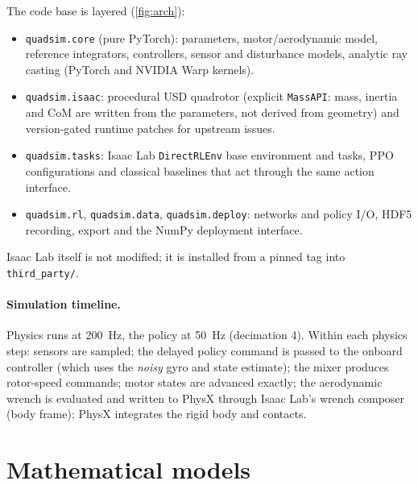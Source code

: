 \documentclass[11pt,a4paper]{article}
\begin{document}
The code base is layered (\cref{fig:arch}):
\begin{itemize}
\item \texttt{quadsim.core} (pure PyTorch): parameters, motor/aerodynamic model, reference integrators, controllers,
sensor and disturbance models, analytic ray casting (PyTorch and NVIDIA Warp kernels).
\item \texttt{quadsim.isaac}: procedural USD quadrotor (explicit \texttt{MassAPI}: mass, inertia and CoM are written
from the parameters, not derived from geometry) and version-gated runtime patches for upstream issues.
\item \texttt{quadsim.tasks}: Isaac Lab \texttt{DirectRLEnv} base environment and tasks, PPO configurations and
classical baselines that act through the same action interface.
\item \texttt{quadsim.rl}, \texttt{quadsim.data}, \texttt{quadsim.deploy}: networks and policy I/O, HDF5 recording,
export and the NumPy deployment interface.
\end{itemize}
Isaac Lab itself is not modified; it is installed from a pinned tag into \texttt{third\_party/}.

\paragraph{Simulation timeline.} Physics runs at \SI{200}{Hz}, the policy at \SI{50}{Hz} (decimation 4). Within each
physics step: sensors are sampled; the delayed policy command is passed to the onboard controller (which uses the
\emph{noisy} gyro and state estimate); the mixer produces rotor-speed commands; motor states are advanced exactly;
the aerodynamic wrench is evaluated and written to PhysX through Isaac Lab's wrench composer (body frame); PhysX
integrates the rigid body and contacts.

\section{Mathematical models}
\end{document}
